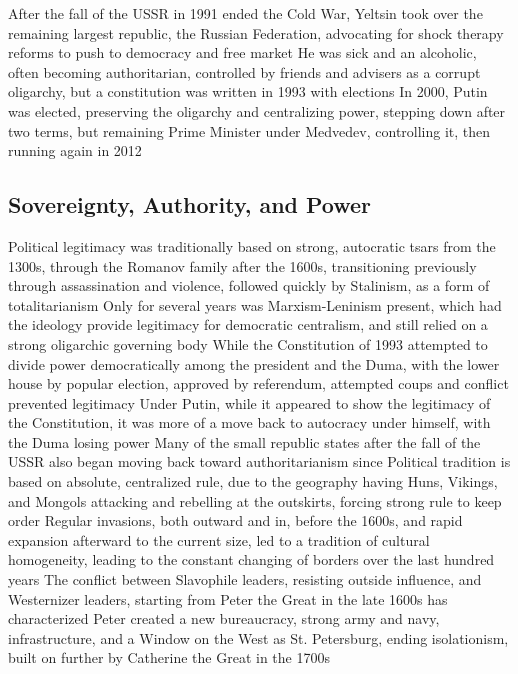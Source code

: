 \documentclass[11 pt, twoside]{article}
\newenvironment{outline*}
{
	\begin{outline}[enumerate]
	}
	{\end{outline}
}
\begin{document}
\begin{outline*}
\1 After the fall of the USSR in 1991 ended the Cold War, Yeltsin took over the remaining largest republic, the Russian Federation, advocating for shock therapy reforms to push to democracy and free market
\2 He was sick and an alcoholic, often becoming authoritarian, controlled by friends and advisers as a corrupt oligarchy, but a constitution was written in 1993 with elections
\2 In 2000, Putin was elected, preserving the oligarchy and centralizing power, stepping down after two terms, but remaining Prime Minister under Medvedev, controlling it, then running again in 2012
\end{outline*}
\subsection{Sovereignty, Authority, and Power}
\begin{outline*}
\1 Political legitimacy was traditionally based on strong, autocratic tsars from the 1300s, through the Romanov family after the 1600s, transitioning previously through assassination and violence, followed quickly by Stalinism, as a form of totalitarianism
\2 Only for several years was Marxism-Leninism present, which had the ideology provide legitimacy for democratic centralism, and still relied on a strong oligarchic governing body
\2 While the Constitution of 1993 attempted to divide power democratically among the president and the Duma, with the lower house by popular election, approved by referendum, attempted coups and conflict prevented legitimacy
\2 Under Putin, while it appeared to show the legitimacy of the Constitution, it was more of a move back to autocracy under himself, with the Duma losing power
\2 Many of the small republic states after the fall of the USSR also began moving back toward authoritarianism since
\1 Political tradition is based on absolute, centralized rule, due to the geography having Huns, Vikings, and Mongols attacking and rebelling at the outskirts, forcing strong rule to keep order
\2 Regular invasions, both outward and in, before the 1600s, and rapid expansion afterward to the current size, led to a tradition of cultural homogeneity, leading to the constant changing of borders over the last hundred years
\2 The conflict between Slavophile leaders, resisting outside influence, and Westernizer leaders, starting from Peter the Great in the late 1600s has characterized
\3 Peter created a new bureaucracy, strong army and navy, infrastructure, and a Window on the West as St. Petersburg, ending isolationism, built on further by Catherine the Great in the 1700s

\end{outline*}
\end{document}
